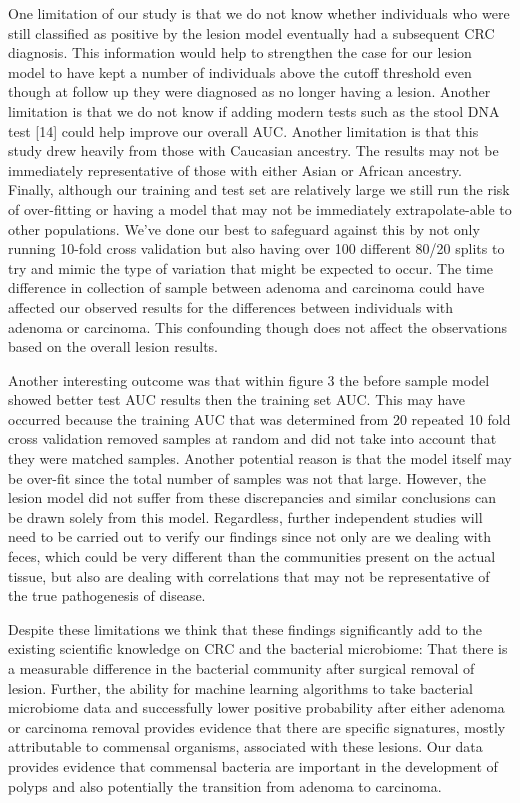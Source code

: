 \documentclass[12pt,]{article}
\begin{document}
One limitation of our study is that we do not know whether individuals
who were still classified as positive by the lesion model eventually had
a subsequent CRC diagnosis. This information would help to strengthen
the case for our lesion model to have kept a number of individuals above
the cutoff threshold even though at follow up they were diagnosed as no
longer having a lesion. Another limitation is that we do not know if
adding modern tests such as the stool DNA test {[}14{]} could help
improve our overall AUC. Another limitation is that this study drew
heavily from those with Caucasian ancestry. The results may not be
immediately representative of those with either Asian or African
ancestry. Finally, although our training and test set are relatively
large we still run the risk of over-fitting or having a model that may
not be immediately extrapolate-able to other populations. We've done our
best to safeguard against this by not only running 10-fold cross
validation but also having over 100 different 80/20 splits to try and
mimic the type of variation that might be expected to occur. The time
difference in collection of sample between adenoma and carcinoma could
have affected our observed results for the differences between
individuals with adenoma or carcinoma. This confounding though does not
affect the observations based on the overall lesion results.

Another interesting outcome was that within figure 3 the before sample
model showed better test AUC results then the training set AUC. This may
have occurred because the training AUC that was determined from 20
repeated 10 fold cross validation removed samples at random and did not
take into account that they were matched samples. Another potential
reason is that the model itself may be over-fit since the total number
of samples was not that large. However, the lesion model did not suffer
from these discrepancies and similar conclusions can be drawn solely
from this model. Regardless, further independent studies will need to be
carried out to verify our findings since not only are we dealing with
feces, which could be very different than the communities present on the
actual tissue, but also are dealing with correlations that may not be
representative of the true pathogenesis of disease.

Despite these limitations we think that these findings significantly add
to the existing scientific knowledge on CRC and the bacterial
microbiome: That there is a measurable difference in the bacterial
community after surgical removal of lesion. Further, the ability for
machine learning algorithms to take bacterial microbiome data and
successfully lower positive probability after either adenoma or
carcinoma removal provides evidence that there are specific signatures,
mostly attributable to commensal organisms, associated with these
lesions. Our data provides evidence that commensal bacteria are
important in the development of polyps and also potentially the
transition from adenoma to carcinoma.
\end{document}
